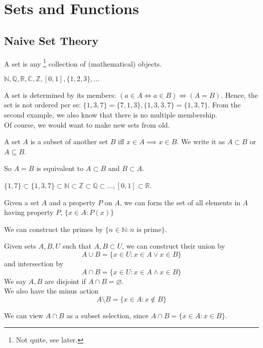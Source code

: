 \section{Sets and Functions}
\subsection{Naive Set Theory}
\begin{definition}
    A set is any
    \footnote{Not quite, see later.}
    collection of (mathematical) objects.
\end{definition}
\begin{example}
    $\mathbb N,\mathbb Q,\mathbb R,\mathbb C,\mathbb Z,[0,1],\{1,2,3\},\ldots$
\end{example}
A set is determined by its members: $(a\in A\iff a\in B)\iff(A=B)$.
Hence, the set is not ordered per se: $\{1,3,7\}=\{7,1,3\},\{1,3,3,7\}=\{1,3,7\}$.
From the second example, we also know that there is no multiple membership.\\
Of course, we would want to make new sets from old.
\begin{definition}
    A set $A$ is a subset of another set $B$ iff $x\in A\implies x\in B$.
    We write it as $A\subset B$ or $A\subseteq B$.
\end{definition}
So $A=B$ is equivalent to $A\subset B$ and $B\subset A$.
\begin{example}
    $\{1,7\}\subset \{1,3,7\}\subset\mathbb N\subset\mathbb Z\subset \mathbb Q\subset\ldots, [0,1]\subset\mathbb R$.
\end{example}
\begin{definition}
    Given a set $A$ and a property $P$ on $A$, we can form the set of all elements in $A$ having property $P$, $\{x\in A:P(x)\}$
\end{definition}
\begin{example}
    We can construct the primes by $\{n\in\mathbb N:\text{$n$ is prime}\}$.
\end{example}
\begin{definition}
    Given sets $A,B,U$ such that $A,B\subset U$, we can construct their union by
    $$A\cup B=\{x\in U:x\in A\lor x\in B\}$$
    and intersection by
    $$A\cap B=\{x\in U:x\in A\land x\in B\}$$
    We say $A,B$ are disjoint if $A\cap B=\varnothing$.\\
    We also have the minus action
    $$A\setminus B=\{x\in A:x\notin B\}$$
\end{definition}
We can view $A\cap B$ as a subset selection, since $A\cap B=\{x\in A:x\in B\}$.
